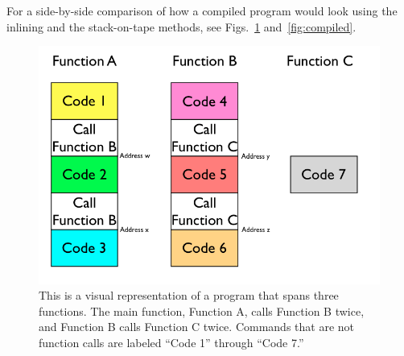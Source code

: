 \documentclass[11pt]{report}
\begin{document}
For a side-by-side comparison of how a compiled program would look using the inlining and the stack-on-tape methods, see Figs.~\ref{fig:code} and~\ref{fig:compiled}.

\begin{figure} 
\begin{center} 
\includegraphics[scale=0.6]{figs/code.png} 
\caption{This is a visual representation of a program that spans three functions. The main function, Function A, calls Function B twice, and Function B calls Function C twice. Commands that are not function calls are labeled ``Code 1'' through ``Code 7.'' \label{fig:code}} 
\end{center} 
\end{figure}
\end{document}
